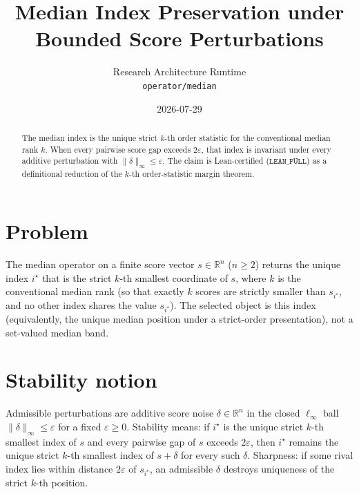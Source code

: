 \documentclass[12pt]{article}
\title{Median Index Preservation under Bounded Score Perturbations}
\author{Research Architecture Runtime\\[0.25em]
{\normalsize\texttt{operator/median}}}
\date{2026-07-29}
\theoremstyle{plain}
\theoremstyle{definition}
\theoremstyle{remark}
\begin{document}
\maketitle

\begin{abstract}
The median index is the unique strict $k$-th order statistic for the conventional median rank $k$. When every pairwise score gap exceeds $2\varepsilon$, that index is invariant under every additive perturbation with $\|\delta\|_\infty\le\varepsilon$. The claim is Lean-certified ($\texttt{LEAN\_FULL}$) as a definitional reduction of the $k$-th order-statistic margin theorem.
\end{abstract}

\noindent
\begin{center}
\end{center}
\vspace{0.6em}

\section{Problem}
{\raggedright\sloppy
The median operator on a finite score vector $s\in\mathbb{R}^n$ ($n\ge 2$) returns the unique index $i^\star$ that is the strict $k$-th smallest coordinate of $s$, where $k$ is the conventional median rank (so that exactly $k$ scores are strictly smaller than $s_{i^\star}$, and no other index shares the value $s_{i^\star}$). The selected object is this index (equivalently, the unique median position under a strict-order presentation), not a set-valued median band.
\par}

\section{Stability notion}
Admissible perturbations are additive score noise $\delta\in\mathbb{R}^n$ in the closed $\ell_\infty$ ball $\|\delta\|_\infty\le\varepsilon$ for a fixed $\varepsilon\ge 0$. Stability means: if $i^\star$ is the unique strict $k$-th smallest index of $s$ and every pairwise gap of $s$ exceeds $2\varepsilon$, then $i^\star$ remains the unique strict $k$-th smallest index of $s+\delta$ for every such $\delta$. Sharpness: if some rival index lies within distance $2\varepsilon$ of $s_{i^\star}$, an admissible $\delta$ destroys uniqueness of the strict $k$-th position.
\end{document}
